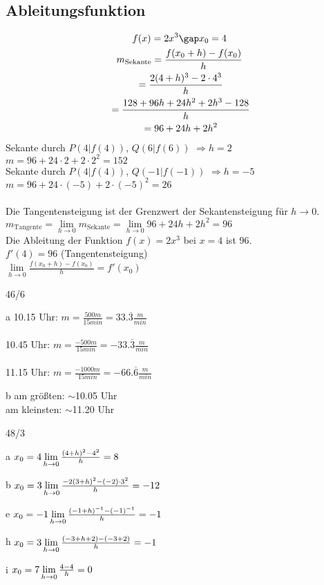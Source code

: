 \subsection{Ableitungsfunktion}
\begin{gather*}
  f(x) = 2x^3\gap x_0 = 4 \\
  m_{\text{Sekante}} = \frac{f(x_0 + h) - f(x_0)}{h} \\
  \;= \frac{2(4 + h)^3 - 2 \cdot 4^3}{h} \\
  \;= \frac{128 + 96h + 24h^2 + 2h^3 - 128}{h} \\
  \;= 96 + 24h + 2h^2
\end{gather*}
Sekante durch $P(4|f(4))$, $Q(6|f(6))$ $\Rightarrow h = 2$ \\
\;$m = 96 + 24 \cdot 2 + 2 \cdot 2^2 = 152$ \\
Sekante durch $P(4|f(4))$, $Q(-1|f(-1))$ $\Rightarrow h = -5$ \\
\;$m = 96 + 24 \cdot (-5) + 2 \cdot (-5)^2 = 26$ \\\\
Die Tangentensteigung ist der Grenzwert der Sekantensteigung für $h \to 0$. \\
$m_{\text{Tangente}} = \lim\limits_{h \to 0} m_{\text{Sekante}} = \lim\limits_{h \to 0} 96 + 24h + 2h^2 = 96$ \\
Die Ableitung der Funktion $f(x) = 2x^3$ bei $x = 4$ ist 96. \\
$f'(4) = 96$ (Tangentensteigung) \\
$\lim\limits_{h \to 0} \frac{f(x_0 + h) - f(x_0)}{h} = f'(x_0)$
\begin{exercise}{46/6}
  \item [a]
  10.15 Uhr: $m = \frac{500m}{15min} = 33.\overline{3}\frac{m}{min}$ \\\\
  10.45 Uhr: $m = \frac{-500m}{15min} = -33.\overline{3}\frac{m}{min}$ \\\\
  11.15 Uhr: $m = \frac{-1000m}{15min} = -66.\overline{6}\frac{m}{min}$
  \item [b]
  am größten: $\sim$10.05 Uhr \\
  am kleinsten: $\sim$11.20 Uhr
\end{exercise}
\begin{exercise}{48/3}
  \item [a] $x_0 = 4\\ \lim\limits_{h \to 0} \frac{(4 + h)^2 - 4^2}{h} = 8$
  \item [b] $x_0 = 3\\ \lim\limits_{h \to 0} \frac{-2(3 + h)^2 - (-2) \cdot 3^2}{h} = -12$
  \item [e] $x_0 = -1\\ \lim\limits_{h \to 0} \frac{(-1 + h)^{-1} - (-1)^{-1}}{h} = -1$
  \item [h] $x_0 = 3\\ \lim\limits_{h \to 0} \frac{(-3 + h + 2) - (-3 + 2)}{h} = -1$
  \item [i] $x_0 = 7\\ \lim\limits_{h \to 0} \frac{4 - 4}{h} = 0$
\end{exercise}

